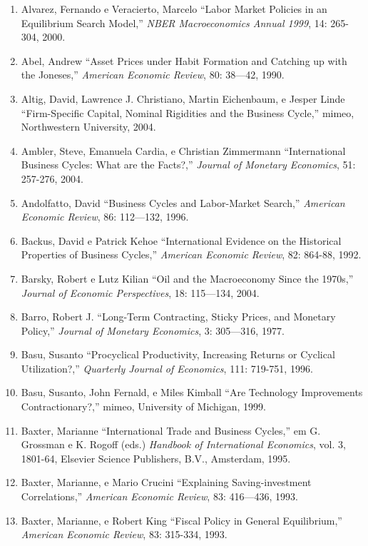 \documentclass[12pt]{article}
\begin{document}
\begin{enumerate}
    \item Alvarez, Fernando e Veracierto, Marcelo “Labor Market Policies in an Equilibrium Search Model,” \textit{NBER Macroeconomics Annual 1999}, 14: 265-304, 2000.
    \item Abel, Andrew “Asset Prices under Habit Formation and Catching up with the Joneses,” \textit{American Economic Review}, 80: 38—42, 1990.
    \item Altig, David, Lawrence J. Christiano, Martin Eichenbaum, e Jesper Linde “Firm-Specific Capital, Nominal Rigidities and the Business Cycle,” mimeo, Northwestern University, 2004.
    \item Ambler, Steve, Emanuela Cardia, e Christian Zimmermann “International Business Cycles: What are the Facts?,” \textit{Journal of Monetary Economics}, 51: 257-276, 2004.
    \item Andolfatto, David “Business Cycles and Labor-Market Search,” \textit{American Economic Review}, 86: 112—132, 1996.
    \item Backus, David e Patrick Kehoe “International Evidence on the Historical Properties of Business Cycles,” \textit{American Economic Review}, 82: 864-88, 1992.
    \item Barsky, Robert e Lutz Kilian “Oil and the Macroeconomy Since the 1970s,” \textit{Journal of Economic Perspectives}, 18: 115—134, 2004.
    \item Barro, Robert J. “Long-Term Contracting, Sticky Prices, and Monetary Policy,” \textit{Journal of Monetary Economics}, 3: 305—316, 1977.
    \item Basu, Susanto “Procyclical Productivity, Increasing Returns or Cyclical Utilization?,” \textit{Quarterly Journal of Economics}, 111: 719-751, 1996.
    \item Basu, Susanto, John Fernald, e Miles Kimball “Are Technology Improvements Contractionary?,” mimeo, University of Michigan, 1999.
    \item Baxter, Marianne “International Trade and Business Cycles,” em G. Grossman e K. Rogoff (eds.) \textit{Handbook of International Economics}, vol. 3, 1801-64, Elsevier Science Publishers, B.V., Amsterdam, 1995.
    \item Baxter, Marianne, e Mario Crucini “Explaining Saving-investment Correlations,” \textit{American Economic Review}, 83: 416—436, 1993.
    \item Baxter, Marianne, e Robert King “Fiscal Policy in General Equilibrium,” \textit{American Economic Review}, 83: 315-334, 1993.

\end{enumerate}
\end{document}
